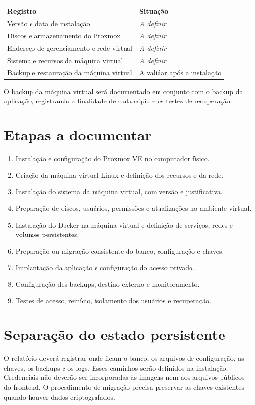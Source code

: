 \documentclass[11pt,a4paper,oneside]{report}
\newcommand{\pendente}{\textit{A definir}}
\begin{document}
\begin{tabularx}{\textwidth}{@{}p{4.4cm}Y@{}}
\toprule
Registro & Situação \\
\midrule
Versão e data de instalação & \pendente \\
Discos e armazenamento do Proxmox & \pendente \\
Endereço de gerenciamento e rede virtual & \pendente \\
Sistema e recursos da máquina virtual & \pendente \\
Backup e restauração da máquina virtual & A validar após a instalação \\
\bottomrule
\end{tabularx}
O backup da máquina virtual será documentado em conjunto com o backup da
aplicação, registrando a finalidade de cada cópia e os testes de recuperação.

\section{Etapas a documentar}
\begin{enumerate}
\item Instalação e configuração do Proxmox VE no computador físico.
\item Criação da máquina virtual Linux e definição dos recursos e da rede.
\item Instalação do sistema da máquina virtual, com versão e justificativa.
\item Preparação de discos, usuários, permissões e atualizações no ambiente virtual.
\item Instalação do Docker na máquina virtual e definição de serviços, redes e volumes persistentes.
\item Preparação ou migração consistente do banco, configuração e chaves.
\item Implantação da aplicação e configuração do acesso privado.
\item Configuração dos backups, destino externo e monitoramento.
\item Testes de acesso, reinício, isolamento dos usuários e recuperação.
\end{enumerate}

\section{Separação do estado persistente}
O relatório deverá registrar onde ficam o banco, os arquivos de configuração,
as chaves, os backups e os logs. Esses caminhos serão definidos na instalação.
Credenciais não deverão ser incorporadas às imagens nem aos arquivos públicos
do frontend. O procedimento de migração precisa preservar as chaves existentes
quando houver dados criptografados.
\end{document}

